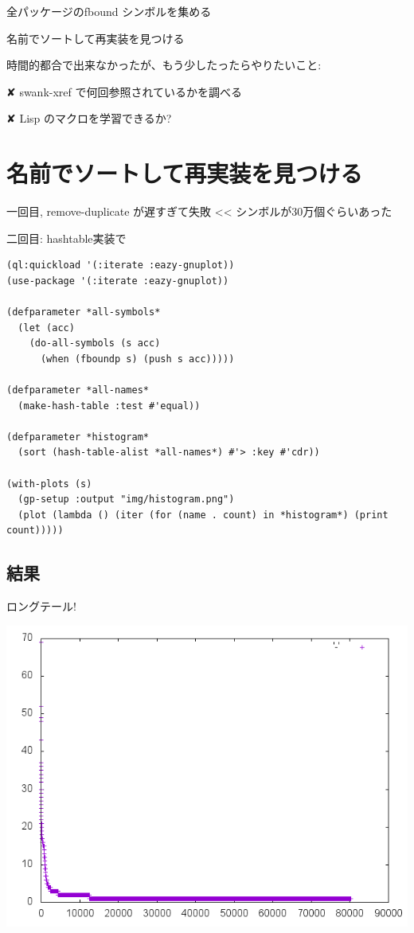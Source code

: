 全パッケージのfbound シンボルを集める

名前でソートして再実装を見つける

時間的都合で出来なかったが、もう少したったらやりたいこと:

✘ swank-xref で何回参照されているかを調べる

✘ Lisp のマクロを学習できるか?

\section{名前でソートして再実装を見つける}
\label{sec-9}

一回目, remove-duplicate が遅すぎて失敗 << シンボルが30万個ぐらいあった

二回目: hashtable実装で

\begin{verbatim}
(ql:quickload '(:iterate :eazy-gnuplot))
(use-package '(:iterate :eazy-gnuplot))

(defparameter *all-symbols*
  (let (acc)
    (do-all-symbols (s acc)
      (when (fboundp s) (push s acc)))))

(defparameter *all-names*
  (make-hash-table :test #'equal))

(defparameter *histogram*
  (sort (hash-table-alist *all-names*) #'> :key #'cdr))

(with-plots (s)
  (gp-setup :output "img/histogram.png")
  (plot (lambda () (iter (for (name . count) in *histogram*) (print count)))))
\end{verbatim}

\subsection{結果}
\label{sec-9-1}

ロングテール!

\includegraphics{img/static/histogram.png}

